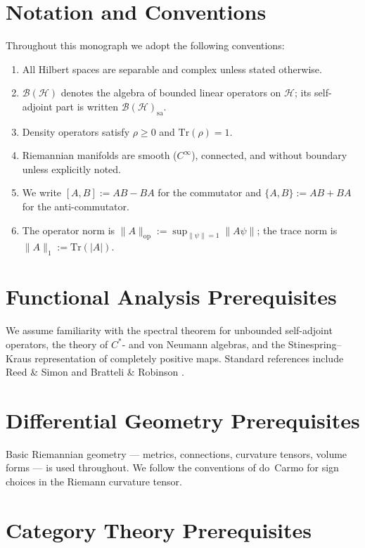 \documentclass[11pt,a4paper,openany]{book}
\theoremstyle{remark}
\newcommand{\CB}{\mathcal{B}}          %
\newcommand{\Tr}{\mathrm{Tr}}
\begin{document}
\section{Notation and Conventions}

Throughout this monograph we adopt the following conventions:
\begin{enumerate}[nosep]
  \item All Hilbert spaces are separable and complex unless stated
        otherwise.
  \item $\CB(\mathcal{H})$ denotes the algebra of bounded linear
        operators on $\mathcal{H}$; its self-adjoint part is written
        $\CB(\mathcal{H})_{\mathrm{sa}}$.
  \item Density operators satisfy $\rho \geq 0$ and
        $\Tr(\rho) = 1$.
  \item Riemannian manifolds are smooth ($C^\infty$), connected, and
        without boundary unless explicitly noted.
  \item We write $[A, B] := AB - BA$ for the commutator and
        $\{A, B\} := AB + BA$ for the anti-commutator.
  \item The operator norm is $\|A\|_{\mathrm{op}} :=
        \sup_{\|\psi\|=1}\|A\psi\|$; the trace norm is
        $\|A\|_1 := \Tr(|A|)$.
\end{enumerate}

\section{Functional Analysis Prerequisites}

We assume familiarity with the spectral theorem for unbounded
self-adjoint operators, the theory of $C^*$- and von Neumann
algebras, and the Stinespring--Kraus representation of completely
positive maps.  Standard references include Reed \& Simon
\cite{reed1980methods} and Bratteli \& Robinson
\cite{bratteli1987operator}.

\section{Differential Geometry Prerequisites}

Basic Riemannian geometry — metrics, connections, curvature tensors,
volume forms — is used throughout.  We follow the conventions of
do~Carmo \cite{docarmo1992riemannian} for sign choices in the
Riemann curvature tensor.

\section{Category Theory Prerequisites}
\end{document}
